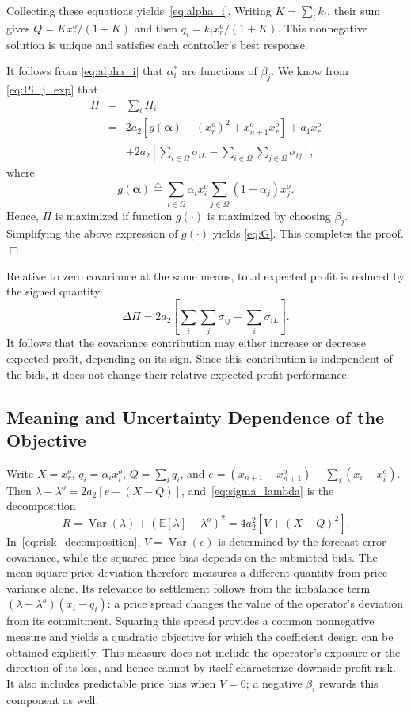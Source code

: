 \documentclass[journal]{IEEEtran}
\begin{document}
Collecting these equations yields~\eqref{eq:alpha_i}. Writing $K=\sum_i k_i$, their sum gives $Q=Kx_r^o/(1+K)$ and then $q_i=k_ix_r^o/(1+K)$. This nonnegative solution is unique and satisfies each controller's best response.

It follows from \eqref{eq:alpha_i} that $\alpha_i^*$ are functions of $\beta_j$. We know from  \eqref{eq:Pi_j_exp} that 
\begin{eqnarray}
    \Pi & = & \sum_i \Pi_i \nonumber \\
     & = & 2a_2\left[ g(\boldsymbol{\alpha}) - \left(x_r^o\right)^2 + x_{n+1}^o x_r^o\right]  +a_1 x_r^o  \nonumber \\ 
     && + 2a_2 \left[ \sum_{i\in\Omega} \sigma_{iL} -\sum_{i\in\Omega}\sum_{j\in\Omega}\sigma_{ij}\right], \label{eq:Pi_exp}
\end{eqnarray}
where
\[ g(\boldsymbol{\alpha}) \stackrel{\triangle}{=} \sum_{i\in\Omega}  \alpha_i x_i^o  \sum_{j\in\Omega} (1-\alpha_j ) x_j^o. \]
Hence, $\Pi$ is maximized if function $g(\cdot)$ is maximized by choosing $\beta_j$.
Simplifying the above expression of $g(\cdot)$ yields \eqref{eq:G}. This completes the proof. \hfill $\Box$

Relative to zero covariance at the same means, total expected profit is reduced by the signed quantity
\begin{equation}
 \Delta\Pi=2a_2\left[\sum_i\sum_j\sigma_{ij}-\sum_i\sigma_{iL}\right].
 \label{eq:D_P}
\end{equation}
It follows that the covariance contribution may either increase or decrease expected profit, depending on its sign. Since this contribution is independent of the bids, it does not change their relative expected-profit performance.

\subsection{Meaning and Uncertainty Dependence of the Objective}
\label{sec:risk_meaning}
Write $X=x_r^o$, $q_i=\alpha_i x_i^o$, $Q=\sum_iq_i$, and $e=(x_{n+1}-x_{n+1}^o)-\sum_i(x_i-x_i^o)$. Then $\lambda-\lambda^o=2a_2[e-(X-Q)]$, and~\eqref{eq:sigma_lambda} is the decomposition
\begin{equation}
 R=\operatorname{Var}(\lambda)+(\mathbb E[\lambda]-\lambda^o)^2
   =4a_2^2[V+(X-Q)^2]. \label{eq:risk_decomposition}
\end{equation}
In~\eqref{eq:risk_decomposition}, $V=\operatorname{Var}(e)$ is determined by the forecast-error covariance, while the squared price bias depends on the submitted bids. The mean-square price deviation therefore measures a different quantity from price variance alone. Its relevance to settlement follows from the imbalance term $(\lambda-\lambda^o)(x_i-q_i)$: a price spread changes the value of the operator's deviation from its commitment. Squaring this spread provides a common nonnegative measure and yields a quadratic objective for which the coefficient design can be obtained explicitly. This measure does not include the operator's exposure or the direction of its loss, and hence cannot by itself characterize downside profit risk. It also includes predictable price bias when $V=0$; a negative $\beta_i$ rewards this component as well.
\end{document}
